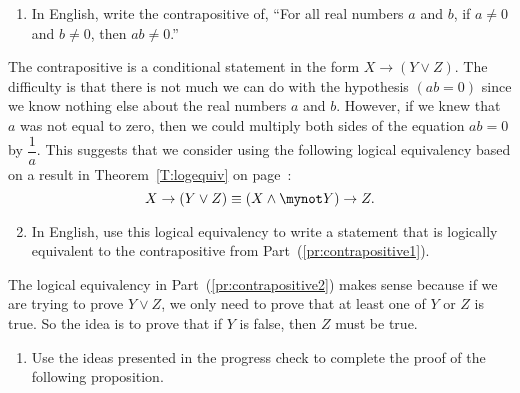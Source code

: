 \begin{prog}\label{pr:contrapositive} \hfill
\begin{enumerate}
\item In English, write the contrapositive of, ``For all real numbers $a$ and $b$, if  $a \ne 0$  and  $b \ne 0$, then  $ab \ne 0$.'' 
\label{pr:contrapositive1}%
\end{enumerate}

The contrapositive is a conditional statement in the form   $X \to \left( {Y \vee Z} \right)$.  The difficulty is that there is not much we can do with the hypothesis  $\left( {ab = 0} \right)$ since we know nothing else about the real numbers  $a$  and  $b$.  However, if we knew that  $a$  was not equal to zero, then we could multiply both sides of the equation  $ab = 0$  by  
$\dfrac{1}{a}$.   This suggests that we consider using the following logical equivalency based on a result in  Theorem~\ref{T:logequiv} on page~\pageref{T:logequiv}:
\[
X \to \left( {Y \vee Z} \right) \equiv \left( {X \wedge \mynot  Y} \right) \to Z.
\]

\begin{enumerate} \setcounter{enumi}{1}
\item In English, use this logical equivalency to write a statement that is logically equivalent to the contrapositive from Part~(\ref{pr:contrapositive1}).
\label{pr:contrapositive2}%
\end{enumerate}


%
%
The logical equivalency in Part~(\ref{pr:contrapositive2}) makes sense because if we are trying to prove  $Y \vee Z$, we only need to prove that at least one of  $Y$  or  $Z$  is true.  So the idea is to prove that if  $Y$  is false, then  $Z$  must be true.  
\setcounter{oldenumi}{\theenumi}
\begin{enumerate} \setcounter{enumi}{\theoldenumi}
\item Use the ideas presented in the progress check to complete the proof of the following proposition.


\end{enumerate}
\end{prog}
